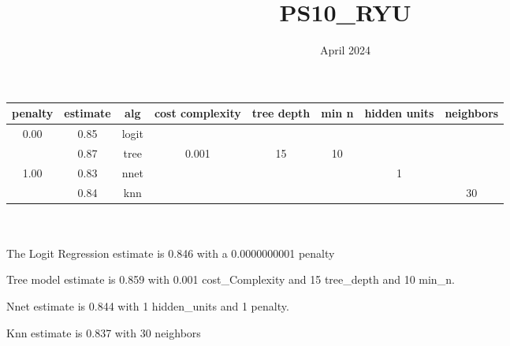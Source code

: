 \documentclass{article}
\title{PS10\_RYU}
\date{April 2024}
\begin{document}
\maketitle


\begin{tabular}{|c|c|c|c|c|c|c|c|}
\hline
penalty & estimate  & alg & cost complexity & tree depth & min n & hidden units & neighbors \\
\hline
0.00 & 0.85  &  logit &  &  &  &  & \\
\hline
 & 0.87 & tree &  0.001 & 15 & 10 &  &   \\
\hline
1.00 & 0.83 &  nnet &  & & & 1 &   \\
\hline
 & 0.84 &  knn &  &  &  &  & 30 \\
\hline
\end{tabular}


\\\
\\

The Logit Regression estimate is 0.846 with a 0.0000000001 penalty

Tree model estimate is 0.859 with 0.001 cost\_Complexity and 15 tree\_depth and 10 min\_n.

Nnet estimate is 0.844 with 1 hidden\_units and 1 penalty.

Knn estimate is 0.837 with 30 neighbors
\end{document}
